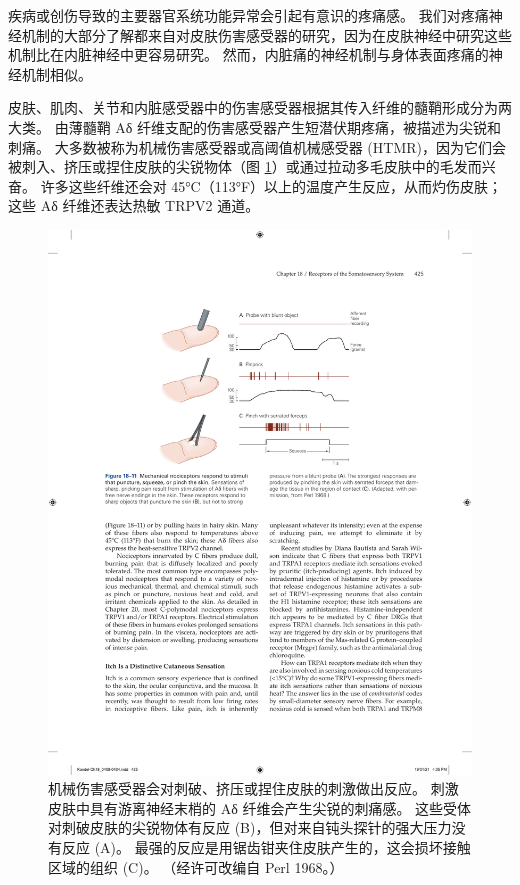 疾病或创伤导致的主要器官系统功能异常会引起有意识的疼痛感。 
我们对疼痛神经机制的大部分了解都来自对皮肤伤害感受器的研究，因为在皮肤神经中研究这些机制比在内脏神经中更容易研究。 
然而，内脏痛的神经机制与身体表面疼痛的神经机制相似。


皮肤、肌肉、关节和内脏感受器中的伤害感受器根据其传入纤维的髓鞘形成分为两大类。 
由薄髓鞘 Aδ 纤维支配的伤害感受器产生短潜伏期疼痛，被描述为尖锐和刺痛。 
大多数被称为机械伤害感受器或高阈值机械感受器 (HTMR)，因为它们会被刺入、挤压或捏住皮肤的尖锐物体（图 \ref{fig:18_11}）或通过拉动多毛皮肤中的毛发而兴奋。 
许多这些纤维还会对 45°C（113°F）以上的温度产生反应，从而灼伤皮肤； 这些 Aδ 纤维还表达热敏 TRPV2 通道。

\begin{figure}[htbp]
	\centering
	\includegraphics[width=1.0\linewidth]{chap18/fig_18_11}
	\caption{机械伤害感受器会对刺破、挤压或捏住皮肤的刺激做出反应。 
		刺激皮肤中具有游离神经末梢的 Aδ 纤维会产生尖锐的刺痛感。 
		这些受体对刺破皮肤的尖锐物体有反应 (B)，但对来自钝头探针的强大压力没有反应 (A)。 
		最强的反应是用锯齿钳夹住皮肤产生的，这会损坏接触区域的组织 (C)。 （经许可改编自 Perl 1968。）}
	\label{fig:18_11}
\end{figure}


